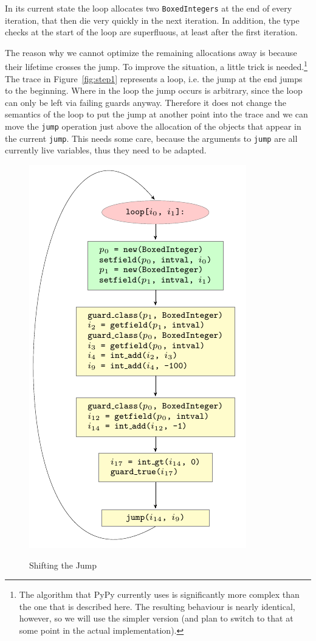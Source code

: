 \documentclass{sigplanconf}
\begin{document}
In its current state the loop
allocates two \texttt{BoxedIntegers} at the end of every iteration, that then die
very quickly in the next iteration. In addition, the type checks at the start
of the loop are superfluous, at least after the first iteration.


The reason why we cannot optimize the remaining allocations away is because
their lifetime crosses the jump. To improve the situation, a little trick is
needed.\footnote{The algorithm that PyPy currently uses is significantly more complex
than the one that is described here. The resulting behaviour is nearly
identical, however, so we will use the simpler version (and plan to switch to
that at some point in the actual implementation).}
The trace in Figure~\ref{fig:step1} represents a loop, i.e. the jump at the end jumps to
the beginning. Where in the loop the jump occurs is arbitrary, since the loop
can only be left via failing guards anyway. Therefore it does not change the
semantics of the loop to put the jump at another point into the trace and we
can move the \texttt{jump} operation just above the allocation of the objects that
appear in the current \texttt{jump}. This needs some care, because the arguments to
\texttt{jump} are all currently live variables, thus they need to be adapted.

\begin{figure}
\includegraphics{figures/step2.pdf}
\label{fig:step2}
\caption{Shifting the Jump}
\end{figure}
\end{document}
